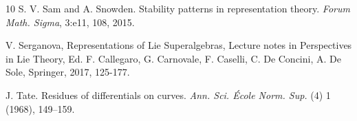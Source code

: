 \documentclass[12pt,reqno]{amsart}
\theoremstyle{definition}
\theoremstyle{remark}
\begin{document}
\begin{thebibliography}{10}
S. V. Sam and A. Snowden. 
Stability patterns in representation theory. 
\newblock \emph{Forum Math. Sigma}, 3:e11, 108, 2015.

V. Serganova, Representations of Lie Superalgebras, Lecture notes in Perspectives in Lie Theory, Ed.
F. Callegaro, G. Carnovale, F. Caselli, C. De Concini, A. De Sole, Springer, 2017, 125-177.

J. Tate.
\newblock Residues of differentials on curves.
\newblock \emph{Ann. Sci. École Norm. Sup.} (4) 1 (1968), 149–159. 




\end{thebibliography}	

	
\end{document}
